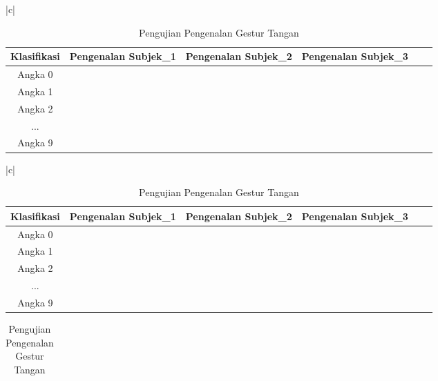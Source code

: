 \begin{table}[H]
	\caption{Pengujian Pengenalan Gestur Tangan}
	\vspace{0.2cm}
	\centering
\begin{tabular}{|c|}
	\hline
	\\

	\begin{tabular}{|c|c|c|c|c|c|c|c|c|c|c|c|c|c|c|c|c|c|c|c|c|c|c|c|c|c|c|c|c|c|c|c|c|}
		\hline
		Klasifikasi & \multicolumn{10}{|c|}{Pengenalan Subjek\_1}& \multicolumn{10}{|c|}{Pengenalan Subjek\_2}& \multicolumn{10}{|c|}{Pengenalan Subjek\_3}\\
		\hline Angka 0 & & & &&&&&&&&&&&&&&&&&&&&&&&&&&&\\
		\hline Angka 1 & & & &&&&&&&&&&&&&&&&&&&&&&&&&&&\\
		\hline Angka 2 & & & & && &&&&&&&&&&&&&&&&&&&&&&&&\\
		
		\hline ... & & & &&&&&&&&&&&&&&&&&&&&&&&&&&& \\
		\hline Angka 9 & & & &&&&&&&&&&&&&&&&&&&&&&&&&&& \\
		\hline
	\end{tabular}
\end{tabular}
\begin{tabular}{|c|}
	\\	
	\begin{tabular}{|c|c|c|c|c|c|c|c|c|c|c|c|c|c|c|c|c|c|c|c|c|c|c|c|c|c|c|c|c|c|c|c|c|}
		\hline
		Klasifikasi & \multicolumn{10}{|c|}{Pengenalan Subjek\_1}& \multicolumn{10}{|c|}{Pengenalan Subjek\_2}& \multicolumn{10}{|c|}{Pengenalan Subjek\_3}\\
		\hline Angka 0 & & & &&&&&&&&&&&&&&&&&&&&&&&&&&&\\
		\hline Angka 1 & & & &&&&&&&&&&&&&&&&&&&&&&&&&&&\\	
		\hline Angka 2 & & & &&&&&&&&&&&&&&&&&&&&&&&&&&&\\	
		\hline ... & & & &&&&&&&&&&&&&&&&&&&&&&&&&&& \\
		\hline Angka 9 & & & &&&&&&&&&&&&&&&&&&&&&&&&&&& \\
		\hline
	\end{tabular}	
\end{tabular}
\begin{tabular}{|c|}


\end{tabular}
\end{table}
